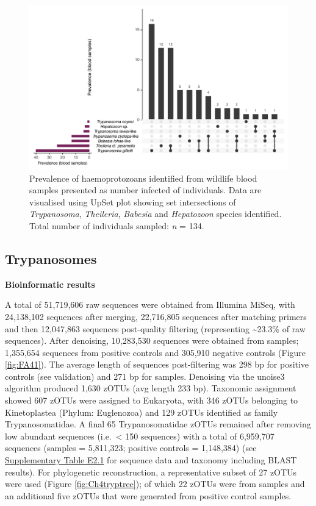 \documentclass[a4paper, nobind]{templates/ociamthesis}
\begin{document}
\begin{figure}
\includegraphics[width=0.95\linewidth]{figures/ms-figs/Ch4-haem-blood-prev} \caption[Summary of haemoprotozoa prevalence in wildlife blood samples.]{Prevalence of haemoprotozoans identified from wildlife blood samples presented as number infected of individuals. Data are visualised using UpSet plot showing set intersections of \textit{Trypanosoma}, \textit{Theileria}, \textit{Babesia} and \textit{Hepatozoon} species identified. Total number of individuals sampled: \textit{n} = 134.}\label{fig:Ch4upset}
\end{figure}

\hypertarget{trypanosomes-1}{%
\subsection{Trypanosomes}\label{trypanosomes-1}}

\textbf{Bioinformatic results}

A total of 51,719,606 raw sequences were obtained from Illumina MiSeq, with 24,138,102 sequences after merging, 22,716,805 sequences after matching primers and then 12,047,863 sequences post-quality filtering (representing \textasciitilde23.3\% of raw sequences).
After denoising, 10,283,530 sequences were obtained from samples; 1,355,654 sequences from positive controls and 305,910 negative controls (Figure \ref{fig:FA41}).
The average length of sequences post-filtering was 298 bp for positive controls (see validation) and 271 bp for samples.
Denoising via the unoise3 algorithm produced 1,630 zOTUs (avg length 233 bp). Taxonomic assignment showed 607 zOTUs were assigned to Eukaryota, with 346 zOTUs belonging to Kinetoplastea (Phylum: Euglenozoa) and 129 zOTUs identified as family Trypanosomatidae.
A final 65 Trypanosomatidae zOTUs remained after removing low abundant sequences (i.e.~\textless{} 150 sequences) with a total of 6,959,707 sequences (samples = 5,811,323; positive controls = 1,148,384) (see \protect\hyperlink{supplementary-table-e2.1}{Supplementary Table E2.1} for sequence data and taxonomy including BLAST results).
For phylogenetic reconstruction, a representative subset of 27 zOTUs were used (Figure \ref{fig:Ch4tryptree}); of which 22 zOTUs were from samples and an additional five zOTUs that were generated from positive control samples.
\end{document}
